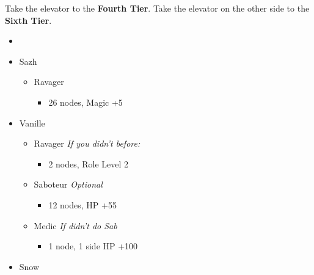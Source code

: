 \begin{multicols}{2}
	Take the elevator to the \textbf{Fourth Tier}.
	Take the elevator on the other side to the \textbf{Sixth Tier}.
	\begin{menu}
		\begin{itemize}
			\paradigm
			\begin{itemize}
				\item {}%
				      {\paradigmline[1]{\textit{\syn}}{\textit{\sab}}{\textit{\rav}}}%
				      {\paradigmline{\com}{\rav}{\rav}}%
				      {\paradigmline{\syn}{\med}{\com}}%
				      {\paradigmline{\com}{\med}{\com}}%
				      {\paradigmline{(\rav)}{\sab}{(\rav)}}%
				      {\paradigmline{\com}{\rav}{\com}}
			\end{itemize}
			\crystarium
			\begin{itemize}
				\item Sazh
				      \begin{itemize}
					      \item Ravager
					            \begin{itemize}
						            \item 26 nodes, Magic +5
					            \end{itemize}
				      \end{itemize}
				\item Vanille
				      \begin{itemize}
					      \item Ravager  \textit{If you didn't before:}
					            \begin{itemize}
						            \item 2 nodes, Role Level 2
					            \end{itemize}
					      \item Saboteur \textit{Optional}
					            \begin{itemize}
						            \item 12 nodes, HP +55
					            \end{itemize}
					      \item Medic \textit{If didn't do Sab}
					            \begin{itemize}
						            \item 1 node, 1 side HP +100
					            \end{itemize}
				      \end{itemize}
				\item Snow
				      \begin{itemize}

\end{itemize}
\end{itemize}
\end{itemize}
\end{menu}
\end{multicols}
